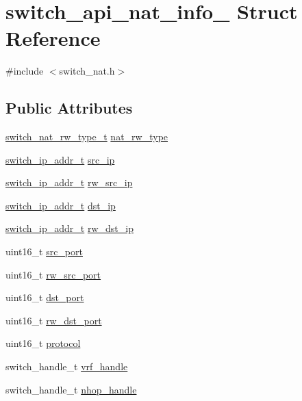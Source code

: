 \hypertarget{structswitch__api__nat__info__}{\section{switch\+\_\+api\+\_\+nat\+\_\+info\+\_\+ Struct Reference}
\label{structswitch__api__nat__info__}
}


{\ttfamily \#include $<$switch\+\_\+nat.\+h$>$}

\subsection*{Public Attributes}
\begin{DoxyCompactItemize}
\item 
\hyperlink{group__NAT_gae9df51650a50efc09ec777885d4ae142}{switch\+\_\+nat\+\_\+rw\+\_\+type\+\_\+t} \hyperlink{structswitch__api__nat__info___a2cbe0f6d24fe512ab4d27fbe6b3d5332}{nat\+\_\+rw\+\_\+type}
\item 
\hyperlink{structswitch__ip__addr__s}{switch\+\_\+ip\+\_\+addr\+\_\+t} \hyperlink{structswitch__api__nat__info___a783525191c4a2068257d17d42665f3a0}{src\+\_\+ip}
\item 
\hyperlink{structswitch__ip__addr__s}{switch\+\_\+ip\+\_\+addr\+\_\+t} \hyperlink{structswitch__api__nat__info___a740535fa9b4f5136eebfe39da909b1df}{rw\+\_\+src\+\_\+ip}
\item 
\hyperlink{structswitch__ip__addr__s}{switch\+\_\+ip\+\_\+addr\+\_\+t} \hyperlink{structswitch__api__nat__info___af4d9fa88f2f1d72451649d6685c01736}{dst\+\_\+ip}
\item 
\hyperlink{structswitch__ip__addr__s}{switch\+\_\+ip\+\_\+addr\+\_\+t} \hyperlink{structswitch__api__nat__info___a16c2c4d919e561874739f6ec7715bd9e}{rw\+\_\+dst\+\_\+ip}
\item 
uint16\+\_\+t \hyperlink{structswitch__api__nat__info___a0ddac9ccfcf828a253278e60c45f2635}{src\+\_\+port}
\item 
uint16\+\_\+t \hyperlink{structswitch__api__nat__info___aa383bcb2221648697b9ccb4b1566bd57}{rw\+\_\+src\+\_\+port}
\item 
uint16\+\_\+t \hyperlink{structswitch__api__nat__info___ae455b86c6301d9ef14118555954a39e7}{dst\+\_\+port}
\item 
uint16\+\_\+t \hyperlink{structswitch__api__nat__info___a98ab0cc5dcb9a9de0d3fef9be6037956}{rw\+\_\+dst\+\_\+port}
\item 
uint16\+\_\+t \hyperlink{structswitch__api__nat__info___a68ec768bbaf46c6abfffd53372e9b63a}{protocol}
\item 
switch\+\_\+handle\+\_\+t \hyperlink{structswitch__api__nat__info___a1149ec3ad18b9eaa5214fe334b7800e9}{vrf\+\_\+handle}
\item 
switch\+\_\+handle\+\_\+t \hyperlink{structswitch__api__nat__info___ad16480b6b6f2261c492a57d05638dd7d}{nhop\+\_\+handle}
\end{DoxyCompactItemize}


